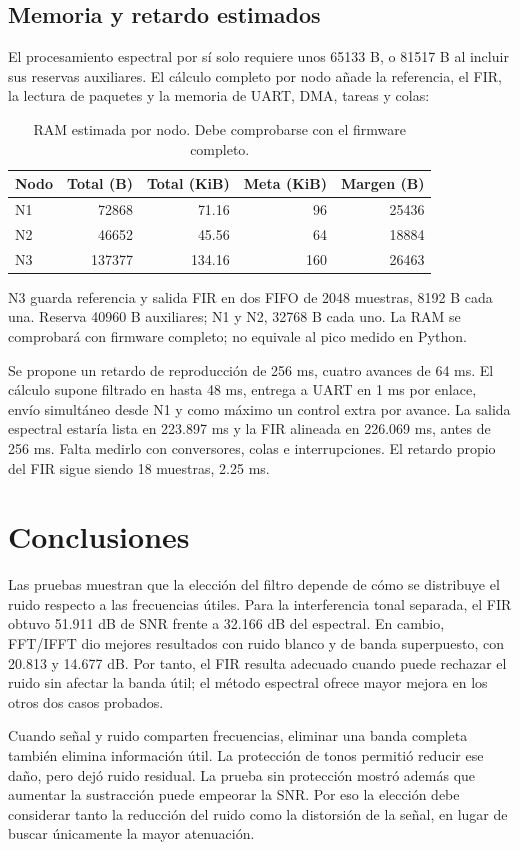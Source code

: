 \documentclass[11pt,a4paper]{article}
\begin{document}
\subsection{Memoria y retardo estimados}
El procesamiento espectral por sí solo requiere unos 65133 B, o 81517 B al incluir sus reservas auxiliares. El cálculo completo por nodo añade la referencia, el FIR, la lectura de paquetes y la memoria de UART, DMA, tareas y colas:
\begin{table}[H]\centering\caption{RAM estimada por nodo. Debe comprobarse con el firmware completo.}\begin{tabular}{lrrrr}\toprule Nodo&Total (B)&Total (KiB)&Meta (KiB)&Margen (B)\\\midrule N1&72868&71.16&96&25436\\N2&46652&45.56&64&18884\\N3&137377&134.16&160&26463\\\bottomrule\end{tabular}\end{table}
N3 guarda referencia y salida FIR en dos FIFO de 2048 muestras, 8192 B cada una. Reserva 40960 B auxiliares; N1 y N2, 32768 B cada uno. La RAM se comprobará con firmware completo; no equivale al pico medido en Python.

Se propone un retardo de reproducción de 256 ms, cuatro avances de 64 ms. El cálculo supone filtrado en hasta 48 ms, entrega a UART en 1 ms por enlace, envío simultáneo desde N1 y como máximo un control extra por avance. La salida espectral estaría lista en 223.897 ms y la FIR alineada en 226.069 ms, antes de 256 ms. Falta medirlo con conversores, colas e interrupciones. El retardo propio del FIR sigue siendo 18 muestras, 2.25 ms.

\section{Conclusiones}
Las pruebas muestran que la elección del filtro depende de cómo se distribuye el ruido respecto a las frecuencias útiles. Para la interferencia tonal separada, el FIR obtuvo 51.911 dB de SNR frente a 32.166 dB del espectral. En cambio, FFT/IFFT dio mejores resultados con ruido blanco y de banda superpuesto, con 20.813 y 14.677 dB. Por tanto, el FIR resulta adecuado cuando puede rechazar el ruido sin afectar la banda útil; el método espectral ofrece mayor mejora en los otros dos casos probados.

Cuando señal y ruido comparten frecuencias, eliminar una banda completa también elimina información útil. La protección de tonos permitió reducir ese daño, pero dejó ruido residual. La prueba sin protección mostró además que aumentar la sustracción puede empeorar la SNR. Por eso la elección debe considerar tanto la reducción del ruido como la distorsión de la señal, en lugar de buscar únicamente la mayor atenuación.
\end{document}
